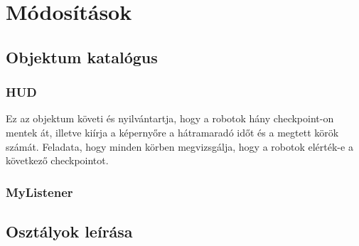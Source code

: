 %
\setcounter{chapter}{-1}
\chapter{Módosítások}
\section{Objektum katalógus}
\subsection{HUD}
Ez az objektum követi és nyilvántartja, hogy a robotok hány checkpoint-on mentek át, illetve kiírja a képernyőre a hátramaradó időt és a megtett körök számát. Feladata, hogy minden körben megvizsgálja, hogy a robotok elérték-e a következő checkpointot.
\subsection{MyListener}

\section{Osztályok leírása}
